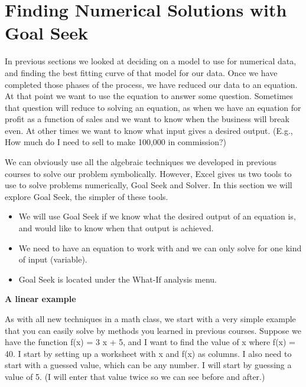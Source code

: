 \documentclass[10pt,]{book}
\newcommand{\terminology}[1]{\textbf{#1}}
\theoremstyle{plain}
\theoremstyle{definition}
\newenvironment{assemblage-untitled}{\mdfsetup{%
roundcorner=2ex, backgroundcolor=blue!5,linecolor=blue!75!black,}%
\begin{mdframed}}{\end{mdframed}}
\theoremstyle{definition}
\begin{document}
\section[{Finding Numerical Solutions with Goal Seek}]{Finding Numerical Solutions with Goal Seek}\label{sec-1-6-GoalSeek}


In previous sections we looked at deciding on a model to use for numerical data, and finding the best fitting curve of that model for our data.  Once we have completed those phases of the process, we have reduced our data to an equation.  At that point we want to use the equation to answer some question.  Sometimes that question will reduce to solving an equation, as when we have an equation for profit as a function of sales and we want to know when the business will break even.  At other times we want to know what input gives a desired output.  (E.g., How much do I need to sell to make \textdollar{}100,000 in commission?)
%
\par

We can obviously use all the algebraic techniques we developed in previous courses to solve our problem symbolically.  However, Excel gives us two tools to use to solve problems numerically, Goal Seek and Solver.  In this section we will explore Goal Seek, the simpler of these tools.
%
\begin{assemblage-untitled}\label{assemblage-11}
\leavevmode%
\begin{itemize}[label=\textbullet]
\item{}We will use Goal Seek if we know what the desired output of an equation is, and would like to know when that output is achieved. %
\item{}We need to have an equation to work with and we can only solve for one kind of input (variable).%
\item{}Goal Seek is located under the What-If analysis menu.%
\end{itemize}
%
\end{assemblage-untitled}
\par

\terminology{A linear example}

%
\par

As with all new techniques in a math class, we start with a very simple example that you can easily solve by methods you learned in previous courses.  Suppose we have the function f(x) = 3 x + 5, and I want to find the value of x where f(x) = 40.  I start by setting up a worksheet with x and f(x) as columns.  I also need to start with a guessed value, which can be any number.  I will start by guessing a value of 5.  (I will enter that value twice so we can see before and after.)
\end{document}
